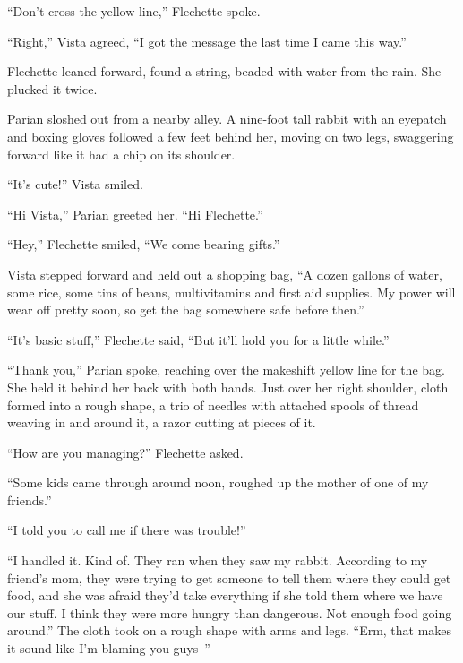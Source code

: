 
``Don't cross the yellow line,'' Flechette spoke.



``Right,'' Vista agreed, ``I got the message the last time I came this way.''



Flechette leaned forward, found a string, beaded with water from the rain.  She plucked it twice.



Parian sloshed out from a nearby alley.  A nine-foot tall rabbit with an eyepatch and boxing gloves followed a few feet behind her, moving on two legs, swaggering forward like it had a chip on its shoulder.



``It's cute!'' Vista smiled.



``Hi Vista,'' Parian greeted her.  ``Hi Flechette.''



``Hey,'' Flechette smiled, ``We come bearing gifts.''



Vista stepped forward and held out a shopping bag, ``A dozen gallons of water, some rice, some tins of beans, multivitamins and first aid supplies.  My power will wear off pretty soon, so get the bag somewhere safe before then.''



``It's basic stuff,'' Flechette said, ``But it'll hold you for a little while.''



``Thank you,'' Parian spoke, reaching over the makeshift yellow line for the bag.  She held it behind her back with both hands.  Just over her right shoulder, cloth formed into a rough shape, a trio of needles with attached spools of thread weaving in and around it, a razor cutting at pieces of it.



``How are you managing?''  Flechette asked.



``Some kids came through around noon, roughed up the mother of one of my friends.''



``I told you to call me if there was trouble!''



``I handled it.  Kind of.  They ran when they saw my rabbit.  According to my friend's mom, they were trying to get someone to tell them where they could get food, and she was afraid they'd take everything if she told them where we have our stuff.  I think they were more hungry than dangerous.  Not enough food going around.''  The cloth took on a rough shape with arms and legs.  ``Erm, that makes it sound like I'm blaming you guys--''



